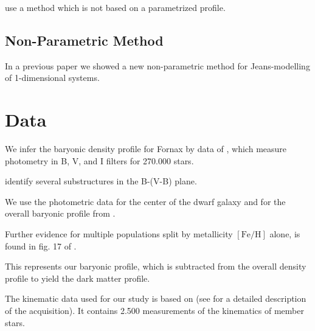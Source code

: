 

\citep{Ibata+2013} use a method which is not based on a parametrized profile. %



\subsection{Non-Parametric Method}
In a previous paper  we showed a new non-parametric
method for Jeans-modelling of 1-dimensional systems.



\section{Data}
We infer the baryonic density profile for Fornax by data of
\cite{DeBoer+2012b}, which measure photometry in B, V, and I filters
for 270.000 stars.


\cite{DeBoer+2013} identify several substructures in the B-(V-B)
plane.  

We use the photometric data for the center of the dwarf galaxy and for
the overall baryonic profile from \cite{DeBoer+2013}.

Further evidence for multiple populations split by metallicity
$[\text{Fe}/\text{H}]$ alone, is found in fig. 17 of
\citep{Hendricks+2014}.






This represents our baryonic profile, which is subtracted from the
overall density profile to yield the dark matter profile.


The kinematic data used for our study is based on \citep{WalkerMateoOlszewski2009b}
(see \citep{WalkerMateoOlszewski2009a} for a detailed description of the
acquisition). It contains 2.500 measurements of the kinematics of member stars.





